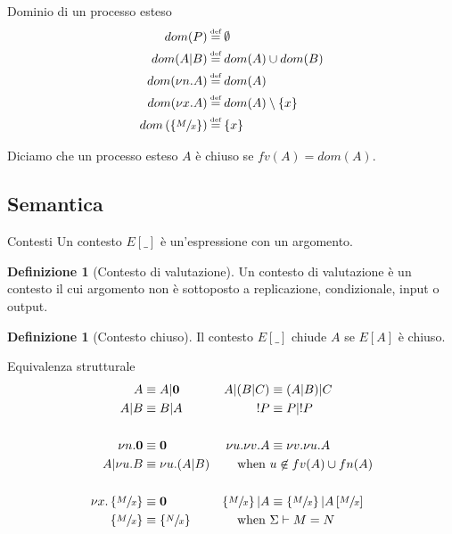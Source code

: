 \documentclass{beamer}
\newcounter{counter1}
\theoremstyle{plain}
\theoremstyle{definition}
\newtheorem{mydef}[counter1]{Definizione}
\theoremstyle{remark}
\newcommand{\set}[1]{\left\{#1\right\}}
\newcommand{\pa}[1]{\left(#1\right)}
\newcommand{\bra}[1]{\left[#1\right]}
\newcommand*{\eqdef}{\ensuremath{\overset{\mathclap{\text{\tiny def}}}{=}}}
\begin{document}
\begin{frame}{Dominio di un processo esteso}
  \begin{align*}
    dom(P) & \eqdef \emptyset \\
    dom(A|B) & \eqdef dom(A) \cup dom(B) \\
    dom(\nu n.A) & \eqdef dom(A) \\
    dom(\nu x.A) & \eqdef dom(A) \setminus \set{x}\\
    dom\pa{ \set{ \sfrac{M}{x}}} & \eqdef \set{x}           
  \end{align*}
  \vfill
  
  Diciamo che un processo esteso $A$ \`e chiuso se $fv(A) = dom(A)$.
\end{frame}

\subsection{Semantica}

\begin{frame}{Contesti}
  Un contesto $E[\_]$ \`e un'espressione con un argomento.
  \begin{mydef}[Contesto di valutazione]
    Un contesto di valutazione \`e un contesto il cui argomento non
    \`e sottoposto a replicazione, condizionale, input o output.
  \end{mydef}
  \begin{mydef}[Contesto chiuso]
    Il contesto $E[\_]$ chiude $A$ se $E[A]$ \`e chiuso.
  \end{mydef}
\end{frame}


\begin{frame}{Equivalenza strutturale}
  \begin{align*}
    A & \equiv A|\mathbf{0} & A|(B|C) & \equiv (A|B)|C \\
    A|B & \equiv B|A & !P & \equiv P|!P \\ \\
    \nu n.\mathbf{0} & \equiv \mathbf{0} & \nu u. \nu v.A & \equiv \nu v. \nu
                                                   u.A \\
    A| \nu u.B & \equiv \nu u. (A|B) & \text{when } & u\not\in fv(A)
                                                     \cup fn(A) \\ \\
    \nu x. \set{\sfrac{M}{x}} & \equiv \mathbf{0} & \set{\sfrac{M}{x}}
                                                    |A & \equiv
                                                         \set{\sfrac{M}{x}}
                                                         |
                                                         A\bra{\sfrac{M}{x}}
    \\
    \set{\sfrac{M}{x}} & \equiv \set{\sfrac{N}{x}} & \text{when } &
                                                                   \Sigma
                                                                   \vdash M=N
  \end{align*}
\end{frame}
\end{document}
